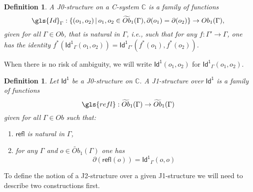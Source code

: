 \documentclass[12pt]{article}
\numberwithin{equation}{section}
\newenvironment{eq}{\begin{equation}}{\end{equation}}
\newtheorem{definition}[proposition]{Definition}
\newcommand{\llabel}[1]{\label{#1}}
\newcommand{\sr}{\rightarrow}
\newcommand{\wt}{\widetilde}
\newcommand{\aCC}{{\mathbb C}}  %
\newcommand{\Id}{\mathsf{Id^1}} %
\newcommand{\refl}{\mathsf{refl}}
\begin{document}
\begin{definition}
\llabel{2015.03.27.def1}
A J0-structure on a C-system $\aCC$ is a family of functions 
%
$$\gls{Id}_{\Gamma}:\{(o_1,o_2)\,|\,o_1, o_2 \in \wt{Ob}_1(\Gamma), \partial(o_1)=\partial(o_2)\}\sr Ob_1(\Gamma),$$
%
given for all $\Gamma\in Ob$, that is natural in $\Gamma$, i.e., such that for any
$f:\Gamma'\sr \Gamma$, one has the identity
$f^*(\Id_{\Gamma}(o_1,o_2))=\Id_{\Gamma'}(f^*(o_1),f^*(o_2))$.
\end{definition}

When there is no risk of ambiguity, we will write $\Id(o_1,o_2)$ for $\Id_{\Gamma}(o_1,o_2)$.

\begin{definition}
\llabel{2015.03.27.def2}
Let $\Id$ be a J0-structure on $\aCC$. A J1-structure over $\Id$ is a family of
functions
%
$$\gls{refl}:\wt{Ob}_1(\Gamma)\sr \wt{Ob}_1(\Gamma)$$
%
given for all $\Gamma\in Ob$ such that:
%
\begin{enumerate}
\item $\refl$ is natural in $\Gamma$,
\item for any $\Gamma$ and $o\in \wt{Ob}_1(\Gamma)$ one has 
%
\begin{eq}
\llabel{2015.03.27.eq8}
\partial(\refl(o))=\Id_\Gamma(o,o)
\end{eq}%
\end{enumerate}
\end{definition}
%
To define the notion of a J2-structure over a given J1-structure we will need
to describe two constructions first.
\end{document}
